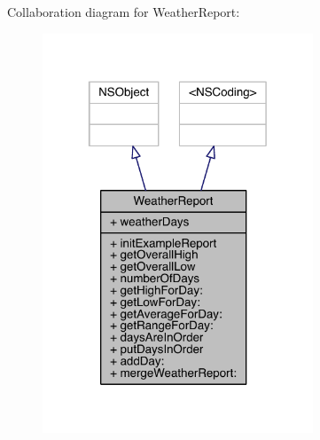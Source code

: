 Collaboration diagram for Weather\-Report\-:
\nopagebreak
\begin{figure}[H]
\begin{center}
\leavevmode
\includegraphics[width=229pt]{interface_weather_report__coll__graph}
\end{center}
\end{figure}

